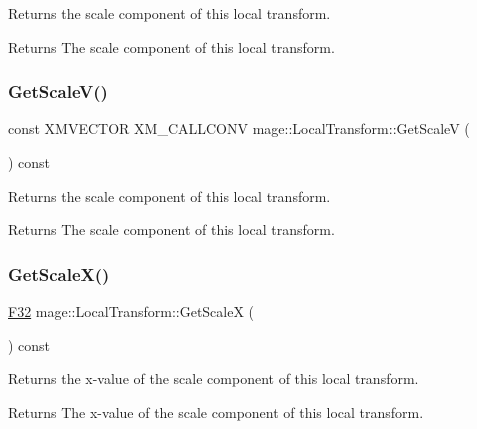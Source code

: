 Returns the scale component of this local transform.

\begin{DoxyReturn}{Returns}
The scale component of this local transform. 
\end{DoxyReturn}
\mbox{\label{classmage_1_1_local_transform_a6c70ee804326d0b5ff54d282630972bc}} 
\subsubsection{\texorpdfstring{Get\+Scale\+V()}{GetScaleV()}}
{\footnotesize\ttfamily const X\+M\+V\+E\+C\+T\+OR X\+M\+\_\+\+C\+A\+L\+L\+C\+O\+NV mage\+::\+Local\+Transform\+::\+Get\+ScaleV (\begin{DoxyParamCaption}{ }\end{DoxyParamCaption}) const\hspace{0.3cm}{\ttfamily [noexcept]}}

Returns the scale component of this local transform.

\begin{DoxyReturn}{Returns}
The scale component of this local transform. 
\end{DoxyReturn}
\mbox{\label{classmage_1_1_local_transform_ad539c04b897276a35bd3f25ad2163371}} 
\subsubsection{\texorpdfstring{Get\+Scale\+X()}{GetScaleX()}}
{\footnotesize\ttfamily \mbox{\hyperlink{namespacemage_aa97e833b45f06d60a0a9c4fc22ae02c0}{F32}} mage\+::\+Local\+Transform\+::\+Get\+ScaleX (\begin{DoxyParamCaption}{ }\end{DoxyParamCaption}) const\hspace{0.3cm}{\ttfamily [noexcept]}}

Returns the x-\/value of the scale component of this local transform.

\begin{DoxyReturn}{Returns}
The x-\/value of the scale component of this local transform. 
\end{DoxyReturn}
\mbox{\label{classmage_1_1_local_transform_a8c15528f78365b5dc853d1e9035b4cc4}} 
